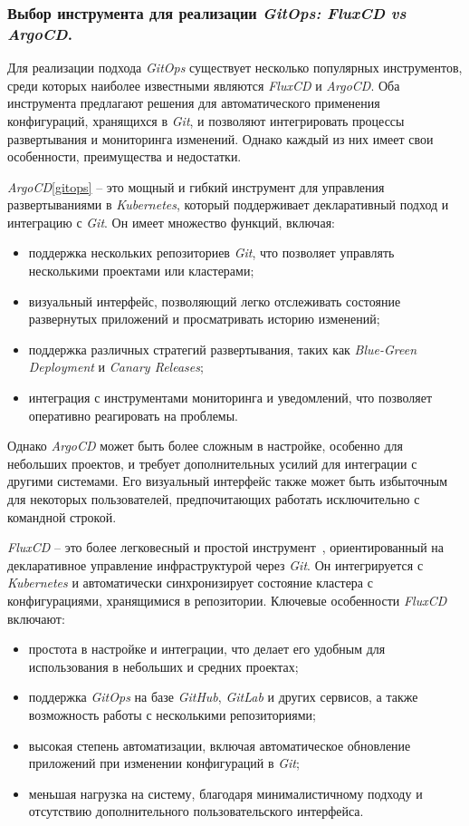 \subsubsection{Выбор инструмента для реализации \textit{GitOps: FluxCD vs ArgoCD}.}
Для реализации подхода \textit{GitOps} существует несколько популярных инструментов, среди которых наиболее известными являются \textit{FluxCD} и \textit{ArgoCD}. Оба инструмента предлагают решения для автоматического применения конфигураций, хранящихся в \textit{Git}, и позволяют интегрировать процессы развертывания и мониторинга изменений. Однако каждый из них имеет свои особенности, преимущества и недостатки.


\textit{ArgoCD}\ref{gitops} -- это мощный и гибкий инструмент для управления развертываниями в \textit{Kubernetes}, который поддерживает декларативный подход и интеграцию с \textit{Git}. Он имеет множество функций, включая:

\begin{itemize}
    \item поддержка нескольких репозиториев \textit{Git}, что позволяет управлять несколькими проектами или кластерами; 
    \item визуальный интерфейс, позволяющий легко отслеживать состояние развернутых приложений и просматривать историю изменений; 
    \item поддержка различных стратегий развертывания, таких как \textit{Blue-Green Deployment} и \textit{Canary Releases}; 
    \item интеграция с инструментами мониторинга и уведомлений, что позволяет оперативно реагировать на проблемы. 
\end{itemize}

Однако \textit{ArgoCD} может быть более сложным в настройке, особенно для небольших проектов, и требует дополнительных усилий для интеграции с другими системами. Его визуальный интерфейс также может быть избыточным для некоторых пользователей, предпочитающих работать исключительно с командной строкой.


\textit{FluxCD} -- это более легковесный и простой инструмент~\cite{fluxcd}, ориентированный на декларативное управление инфраструктурой через \textit{Git}. Он интегрируется с \textit{Kubernetes} и автоматически синхронизирует состояние кластера с конфигурациями, хранящимися в репозитории. Ключевые особенности \textit{FluxCD} включают:

\begin{itemize}
    \item простота в настройке и интеграции, что делает его удобным для использования в небольших и средних проектах; 
    \item поддержка \textit{GitOps} на базе \textit{GitHub}, \textit{GitLab} и других сервисов, а также возможность работы с несколькими репозиториями; 
    \item высокая степень автоматизации, включая автоматическое обновление приложений при изменении конфигураций в \textit{Git}; 
    \item меньшая нагрузка на систему, благодаря минималистичному подходу и отсутствию дополнительного пользовательского интерфейса. 
\end{itemize}

